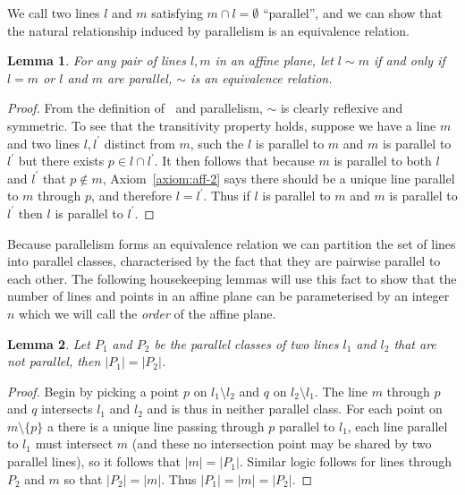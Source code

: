 \documentclass{article}
\newtheorem{lemma}{Lemma}
\begin{document}
We call two lines \(l\) and \(m\) satisfying \(m \cap l = \emptyset\) “parallel”, and we can show that the natural relationship induced by parallelism is an equivalence relation.

\begin{lemma}\label{lemma:parallel}
  For any pair of lines \(l, m\) in an affine plane, let \(l \sim m\) if and only if \(l = m\) or \(l\) and \(m\) are parallel, \(\sim\) is an equivalence relation.
\end{lemma}
\begin{proof}
  From the definition of \(~\) and parallelism, \(\sim\) is clearly reflexive and symmetric. To see that the transitivity property holds, suppose we have a line \(m\) and two lines \(l, l^{\prime}\) distinct from \(m\), such the \(l\) is parallel to \(m\) and \(m\) is parallel to \(l^{\prime}\) but there exists \(p \in l \cap l^{\prime}\).
  It then follows that because \(m\) is parallel to both \(l\) and \(l^{\prime}\) that \(p \notin m\), Axiom~\ref{axiom:aff-2} says there should be a unique line parallel to \(m\) through \(p\), and therefore \(l = l^{\prime}\). Thus if \(l\) is parallel to \(m\) and \(m\) is parallel to \(l^{\prime}\) then \(l\) is parallel to \(l^{\prime}\).
\end{proof}

Because parallelism forms an equivalence relation we can partition the set of lines into parallel classes, characterised by the fact that they are pairwise parallel to each other. The following housekeeping lemmas will use this fact to show that the number of lines and points in an affine plane can be parameterised by an integer \(n\) which we will call the \textit{order} of the affine plane.

\begin{lemma}\label{lemma:parallelclasses}
  Let \(P_{1}\) and \(P_{2}\) be the parallel classes of two lines \(l_{1}\) and \(l_{2}\) that are not parallel, then \(|P_{1}| = |P_{2}|\).
\end{lemma}
\begin{proof}
  Begin by picking a point \(p\) on \(l_{1} \setminus l_{2}\) and \(q\) on \(l_{2} \setminus l_{1}\). The line \(m\) through \(p\) and \(q\) intersects \(l_{1}\) and \(l_{2}\) and is thus in neither parallel class. For each point on \(m \setminus \{p\}\) a there is a unique line passing through \(p\) parallel to \(l_{1}\), each line parallel to \(l_{1}\) must intersect \(m\)
  (and these no intersection point may be shared by two parallel lines), so it follows that \(|m| = |P_{1}|\). Similar logic follows for lines through \(P_{2}\) and \(m\) so that \(|P_{2}| = |m|\). Thus \(|P_{1}| = |m| = |P_{2}|\).
\end{proof}
\end{document}
